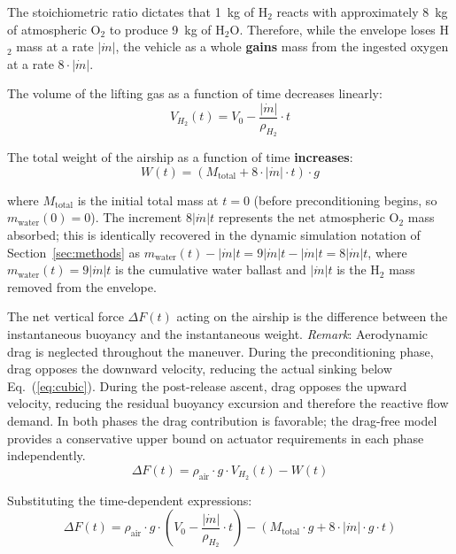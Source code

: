 The stoichiometric ratio dictates that 1~kg of H$_2$ reacts with approximately 8~kg of atmospheric O$_2$ to produce 9~kg of H$_2$O.
Therefore, while the envelope loses H$_2$ mass at a rate $|\dot{m}|$, the vehicle as a whole \textbf{gains} mass from the ingested oxygen at a rate $8 \cdot |\dot{m}|$.

The volume of the lifting gas as a function of time decreases linearly:
\begin{equation}
  V_{H_2}(t) = V_0 - \frac{|\dot{m}|}{\rho_{H_2}} \cdot t
\end{equation}

The total weight of the airship as a function of time \textbf{increases}:
\begin{equation}
  W(t) = \left(M_{\text{total}} + 8 \cdot |\dot{m}| \cdot t\right) \cdot g
\end{equation}

where $M_{\text{total}}$ is the initial total mass at $t = 0$ (before preconditioning begins, so
$m_{\text{water}}(0) = 0$). The increment $8|\dot{m}|t$ represents the net atmospheric O$_2$ mass
absorbed; this is identically recovered in the dynamic simulation notation of
Section~\ref{sec:methods} as $m_\text{water}(t) - |\dot{m}|t = 9|\dot{m}|t - |\dot{m}|t = 8|\dot{m}|t$,
where $m_\text{water}(t) = 9|\dot{m}|t$ is the cumulative water ballast and $|\dot{m}|t$ is the
H$_2$ mass removed from the envelope.

The net vertical force $\Delta F(t)$ acting on the airship is the difference between the instantaneous buoyancy and the instantaneous weight.
\textit{Remark}: Aerodynamic drag is neglected throughout the maneuver.
During the preconditioning phase, drag opposes the downward velocity, reducing
the actual sinking below Eq.~(\ref{eq:cubic}). During the post-release ascent,
drag opposes the upward velocity, reducing the residual buoyancy excursion and
therefore the reactive flow demand. In both phases the drag contribution is
favorable; the drag-free model provides a conservative upper bound on actuator
requirements in each phase independently.
\begin{equation}
  \Delta F(t) = \rho_{\text{air}} \cdot g \cdot V_{H_2}(t) - W(t)
\end{equation}

Substituting the time-dependent expressions:
\begin{equation}
  \Delta F(t) = \rho_{\text{air}} \cdot g \cdot \left( V_0 - \frac{|\dot{m}|}{\rho_{H_2}} \cdot t \right) - \left( M_{\text{total}} \cdot g + 8 \cdot |\dot{m}| \cdot g \cdot t \right)
\end{equation}

